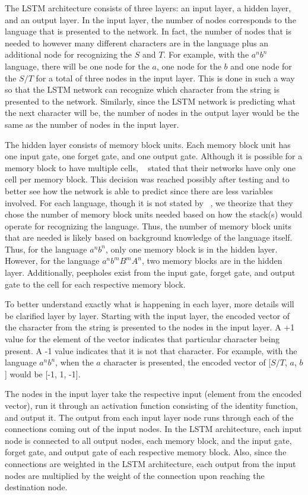 \documentclass[11pt,letterpaper]{article}
\begin{document}
	The LSTM architecture consists of three layers: an input layer, a hidden layer, and an output layer. In the input layer, the number of nodes corresponds to the language that is presented to the network. In fact, the number of nodes that is needed to however many different characters are in the language plus an additional node for recognizing the $S$ and $T$. For example, with the $a^nb^n$ language, there will be one node for the $a$, one node for the $b$ and one node for the $S/T$ for a total of three nodes in the input layer. This is done in such a way so that the LSTM network can recognize which character from the string is presented to the network. Similarly, since the LSTM network is predicting what the next character will be, the number of nodes in the output layer would be the same as the number of nodes in the input layer.

	The hidden layer consists of memory block units. Each memory block unit has one input gate, one forget gate, and one output gate. Although it is possible for a memory block to have multiple cells, ~\cite{Gers:01} stated that their networks have only one cell per memory block. This decision was reached possibly after testing and to better see how the network is able to predict since there are less variables involved. For each language, though it is not stated by ~\cite{Gers:01}, we theorize that they chose the number of memory block units needed based on how the stack(s) would operate for recognizing the language. Thus, the number of memory block units that are needed is likely based on background knowledge of the language itself. Thus, for the language $a^nb^n$, only one memory block is in the hidden layer. However, for the language $a^nb^mB^mA^n$, two memory blocks are in the hidden layer. Additionally, peepholes exist from the input gate, forget gate, and output gate to the cell for each respective memory block.

	To better understand exactly what is happening in each layer, more details will be clarified layer by layer. Starting with the input layer, the encoded vector of the character from the string is presented to the nodes in the input layer. A +1 value for the element of the vector indicates that particular character being present. A -1 value indicates that it is not that character. For example, with the language $a^nb^n$, when the $a$ character is presented, the encoded vector of [$S/T$, $a$, $b$] would be [-1, 1, -1].

	The nodes in the input layer take the respective input (element from the encoded vector), run it through an activation function consisting of the identity function, and output it. The output from each input layer node runs through each of the connections coming out of the input nodes. In the LSTM architecture, each input node is connected to all output nodes, each memory block, and the input gate, forget gate, and output gate of each respective memory block. Also, since the connections are weighted in the LSTM architecture, each output from the input nodes are multiplied by the weight of the connection upon reaching the destination node.
\end{document}
